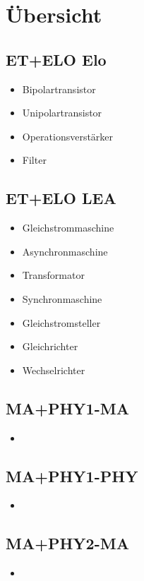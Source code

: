 
\section{Übersicht}

\subsection{ET+ELO Elo}
\begin{itemize}
  \item Bipolartransistor
  \item Unipolartransistor
  \item Operationsverstärker
  \item Filter
\end{itemize}

\subsection{ET+ELO LEA}
\begin{itemize}
  \item Gleichstrommaschine
  \item Asynchronmaschine
  \item Transformator
  \item Synchronmaschine
  \item Gleichstromsteller
  \item Gleichrichter
  \item Wechselrichter
\end{itemize}

\subsection{MA+PHY1-MA}
\begin{itemize}
  \item 
\end{itemize}

\subsection{MA+PHY1-PHY}
\begin{itemize}
  \item 
\end{itemize}

\subsection{MA+PHY2-MA}
\begin{itemize}
  \item 
\end{itemize}

